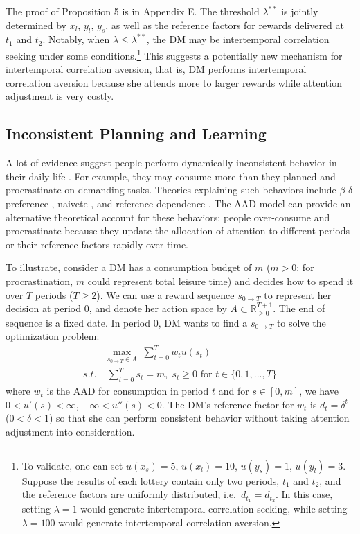 \documentclass[
  12pt,
]{article}
\begin{document}
The proof of Proposition 5 is in Appendix E. The threshold
\(\lambda^{**}\) is jointly determined by \(x_l\), \(y_l\), \(y_s\), as
well as the reference factors for rewards delivered at \(t_1\) and
\(t_2\). Notably, when \(\lambda \leq \lambda^{**}\), the DM may be
intertemporal correlation seeking under some conditions.\footnote{To
  validate, one can set \(u(x_s)=5\), \(u(x_l)=10\), \(u(y_s)=1\),
  \(u(y_l)=3\). Suppose the results of each lottery contain only two
  periods, \(t_1\) and \(t_2\), and the reference factors are uniformly
  distributed, i.e.~\(d_{t_1}=d_{t_2}\). In this case, setting
  \(\lambda=1\) would generate intertemporal correlation seeking, while
  setting \(\lambda=100\) would generate intertemporal correlation
  aversion.} This suggests a potentially new mechanism for intertemporal
correlation aversion, that is, DM performs intertemporal correlation
aversion because she attends more to larger rewards while attention
adjustment is very costly.

\hypertarget{inconsistent-planning-and-learning}{%
\subsection{Inconsistent Planning and
Learning}\label{inconsistent-planning-and-learning}}

A lot of evidence suggest people perform dynamically inconsistent
behavior in their daily life \citep{ericson2019intertemporal}. For
example, they may consume more than they planned and procrastinate on
demanding tasks. Theories explaining such behaviors include
\(\beta\)-\(\delta\) preference \citep{laibson1997golden}, naivete
\citep{o1999doing}, and reference dependence
\citep{kHoszegi2009reference}. The AAD model can provide an alternative
theoretical account for these behaviors: people over-consume and
procrastinate because they update the allocation of attention to
different periods or their reference factors rapidly over time.

To illustrate, consider a DM has a consumption budget of \(m\) (\(m>0\);
for procrastination, \(m\) could represent total leisure time) and
decides how to spend it over \(T\) periods (\(T\geq 2\)). We can use a
reward sequence \(s_{0\rightarrow T}\) to represent her decision at
period 0, and denote her action space by
\(A\subset \mathbb{R}_{\geq 0}^{T+1}\). The end of sequence is a fixed
date. In period 0, DM wants to find a \(s_{0\rightarrow T}\) to solve
the optimization problem:\[\tag{5}
\begin{aligned}
& \max_{s_{0\rightarrow T}\in A}\;\sum_{t=0}^T w_t u(s_t)\\ 
s.t. &\;\sum_{t=0}^T s_t = m,\; s_t \geq 0 \text{ for } t\in\{0,1,...,T\}
\end{aligned}
\]where \(w_t\) is the AAD for consumption in period \(t\) and for
\(s\in[0,m]\), we have \(0<u'(s)<\infty\), \(-\infty<u''(s)<0\). The
DM's reference factor for \(w_t\) is \(d_t=\delta^t\) (\(0<\delta<1\))
so that she can perform consistent behavior without taking attention
adjustment into consideration.
\end{document}
